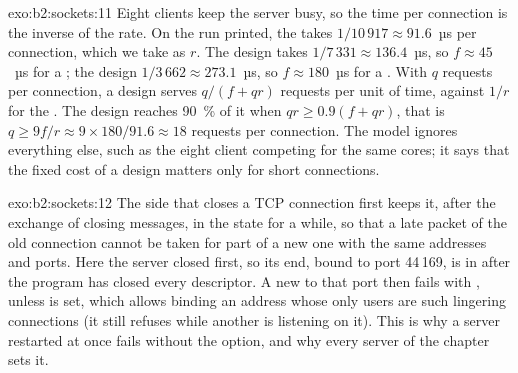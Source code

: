 \begin{solution}{exo:b2:sockets:11}
Eight clients keep the server busy, so the time per connection is the inverse of the rate. On the run printed, the
 takes $1/10\,917 \approx 91.6$~µs per connection, which we take as $r$. The  design takes
$1/7\,331 \approx 136.4$~µs, so $f \approx 45$~µs for a ; the  design $1/3\,662 \approx 273.1$~µs, so
$f \approx 180$~µs for a . With $q$ requests per connection, a design serves $q / (f + q r)$ requests per unit
of time, against $1/r$ for the . The  design reaches 90~\% of it when $q r \ge 0.9 (f + q r)$, that
is $q \ge 9 f / r \approx 9 \times 180 / 91.6 \approx 18$ requests per connection. The model ignores everything else,
such as the eight client  competing for the same cores; it says that the fixed cost of a design matters only
for short connections.
\end{solution}

\begin{solution}{exo:b2:sockets:12}
The side that closes a TCP connection first keeps it, after the exchange of closing messages, in the state
 for a while, so that a late packet of the old connection cannot be taken for part of a new one with
the same addresses and ports. Here the server closed first, so its end, bound to port 44\,169, is in
 after the program has closed every descriptor. A new  to that port then fails with
, unless  is set, which allows binding an address whose only users are such
lingering connections (it still refuses while another  is listening on it). This is why a server restarted at
once fails without the option, and why every server of the chapter sets it.
\end{solution}

